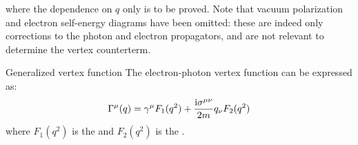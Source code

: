 where the dependence on $ q $ only is to be proved. Note that vacuum polarization and electron self-energy diagrams have been omitted: these are indeed only corrections to the photon and electron propagators, and are not relevant to determine the vertex counterterm.

\begin{lemma}{Generalized vertex function}{}
  The electron-photon vertex function can be expressed as:
  \begin{equation}
    \Gamma^\mu(q) = \gamma^\mu F_1(q^2) + \frac{\mathrm{i} \sigma^{\mu \nu}}{2m} q_\nu F_2(q^2)
    \label{eq:vertex-function}
  \end{equation}
  where $ F_1(q^2) $ is the  and $ F_2(q^2) $ is the .
\end{lemma}


